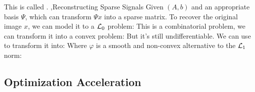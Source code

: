 \documentclass[12pt]{report}
\begin{document}
This is called .
\sep{Reconstructing Sparse Signals}
Given $(A,b)$ and an appropriate basis $\Psi$, which can transform $\Psi x$ into a sparse matrix. To recover the original image $x$,
we can model it to a $\mathcal{L}_0$ problem:
This is a combinatorial problem, we can transform it into a convex problem:
But it's still undifferentiable. We can use  to transform it into:
Where $\varphi$ is a smooth and non-convex alternative to the $\mathcal{L}_1$ norm:

\subsection{Optimization Acceleration}
\end{document}
